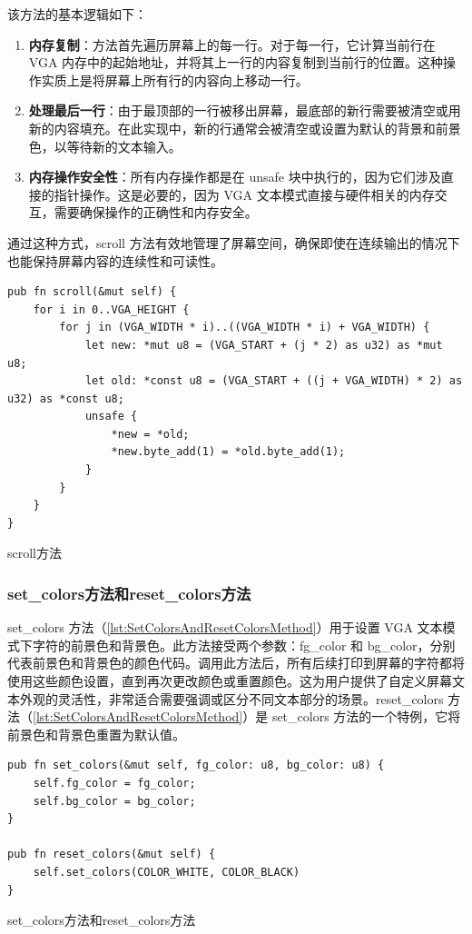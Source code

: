 该方法的基本逻辑如下：

\begin{enumerate}
    \item \textbf{内存复制}：方法首先遍历屏幕上的每一行。对于每一行，它计算当前行在 VGA 内存中的起始地址，并将其上一行的内容复制到当前行的位置。这种操作实质上是将屏幕上所有行的内容向上移动一行。
    \item \textbf{处理最后一行}：由于最顶部的一行被移出屏幕，最底部的新行需要被清空或用新的内容填充。在此实现中，新的行通常会被清空或设置为默认的背景和前景色，以等待新的文本输入。
    \item \textbf{内存操作安全性}：所有内存操作都是在 unsafe 块中执行的，因为它们涉及直接的指针操作。这是必要的，因为 VGA 文本模式直接与硬件相关的内存交互，需要确保操作的正确性和内存安全。
\end{enumerate}

通过这种方式，scroll 方法有效地管理了屏幕空间，确保即使在连续输出的情况下也能保持屏幕内容的连续性和可读性。

\begin{listing}[htbp]
    \begin{verbatim}
pub fn scroll(&mut self) {
    for i in 0..VGA_HEIGHT {
        for j in (VGA_WIDTH * i)..((VGA_WIDTH * i) + VGA_WIDTH) {
            let new: *mut u8 = (VGA_START + (j * 2) as u32) as *mut u8;
            let old: *const u8 = (VGA_START + ((j + VGA_WIDTH) * 2) as u32) as *const u8;
            unsafe {
                *new = *old;
                *new.byte_add(1) = *old.byte_add(1);
            }
        }
    }
}
    \end{verbatim}
    \caption{scroll方法}\label{lst:ScrollMethod}
\end{listing}

\subsubsection{set\_colors方法和reset\_colors方法}

set\_colors 方法（\cref{lst:SetColorsAndResetColorsMethod}）用于设置 VGA 文本模式下字符的前景色和背景色。此方法接受两个参数：fg\_color 和 bg\_color，分别代表前景色和背景色的颜色代码。调用此方法后，所有后续打印到屏幕的字符都将使用这些颜色设置，直到再次更改颜色或重置颜色。这为用户提供了自定义屏幕文本外观的灵活性，非常适合需要强调或区分不同文本部分的场景。reset\_colors 方法（\cref{lst:SetColorsAndResetColorsMethod}）是 set\_colors 方法的一个特例，它将前景色和背景色重置为默认值。

\begin{listing}[htbp]
    \begin{verbatim}
pub fn set_colors(&mut self, fg_color: u8, bg_color: u8) {
    self.fg_color = fg_color;
    self.bg_color = bg_color;
}

pub fn reset_colors(&mut self) {
    self.set_colors(COLOR_WHITE, COLOR_BLACK)
}
    \end{verbatim}
    \caption{set\_colors方法和reset\_colors方法}\label{lst:SetColorsAndResetColorsMethod}
\end{listing}

